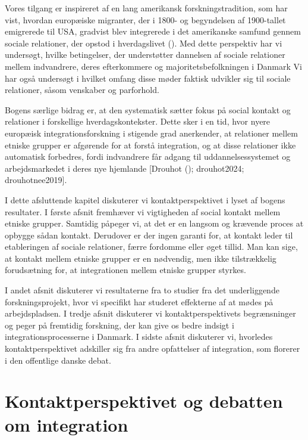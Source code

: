 \documentclass[
]{book}
\begin{document}
Vores tilgang er inspireret af en lang amerikansk forskningstradition, som har vist, hvordan europæiske migranter, der i 1800- og begyndelsen af 1900-tallet emigrerede til USA, gradvist blev integrerede i det amerikanske samfund gennem sociale relationer, der opstod i hverdagslivet (). Med dette perspektiv har vi undersøgt, hvilke betingelser, der understøtter dannelsen af sociale relationer mellem indvandrere, deres efterkommere og majoritetsbefolkningen i Danmark Vi har også undersøgt i hvilket omfang disse møder faktisk udvikler sig til sociale relationer, såsom venskaber og parforhold.

Bogens særlige bidrag er, at den systematisk sætter fokus på social kontakt og relationer i forskellige hverdagskontekster. Dette sker i en tid, hvor nyere europæisk integrationsforskning i stigende grad anerkender, at relationer mellem etniske grupper er afgørende for at forstå integration, og at disse relationer ikke automatisk forbedres, fordi indvandrere får adgang til uddannelsessystemet og arbejdsmarkedet i deres nye hjemlande {[}Drouhot (); drouhot2024; drouhotnee2019{]}.

I dette afsluttende kapitel diskuterer vi kontaktperspektivet i lyset af bogens resultater. I første afsnit fremhæver vi vigtigheden af social kontakt mellem etniske grupper. Samtidig påpeger vi, at det er en langsom og krævende proces at opbygge sådan kontakt. Derudover er der ingen garanti for, at kontakt leder til etableringen af sociale relationer, færre fordomme eller øget tillid. Man kan sige, at kontakt mellem etniske grupper er en nødvendig, men ikke tilstrækkelig forudsætning for, at integrationen mellem etniske grupper styrkes.

I andet afsnit diskuterer vi resultaterne fra to studier fra det underliggende forskningsprojekt, hvor vi specifikt har studeret effekterne af at mødes på arbejdspladsen. I tredje afsnit diskuterer vi kontaktperspektivets begrænsninger og peger på fremtidig forskning, der kan give os bedre indsigt i integrationsprocesserne i Danmark. I sidste afsnit diskuterer vi, hvorledes kontaktperspektivet adskiller sig fra andre opfattelser af integration, som florerer i den offentlige danske debat.

\section{Kontaktperspektivet og debatten om integration}\label{kontaktperspektivet-og-debatten-om-integration}
\end{document}
